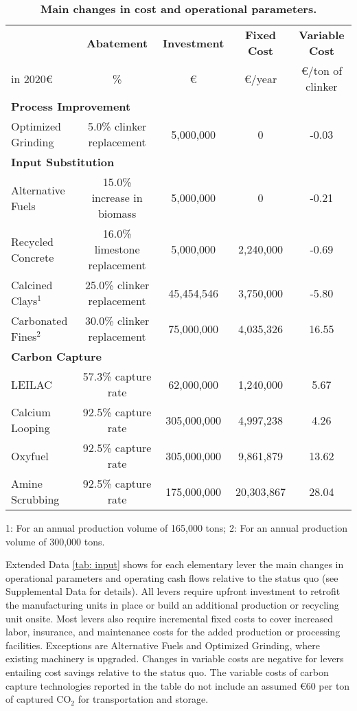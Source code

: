 \documentclass[12pt, a4paper]{article} %
\newcommand{\Suppl}{Supplemental}
\begin{document}
\begin{table}[ht!]
\centering
\begin{threeparttable}
\caption{\textbf{Main changes in cost and operational parameters.}}
\label{tab: input}
\small
\setlength\tabcolsep{3pt} %
\begin{tabular}{l c c c c}
\toprule
& \textbf{Abatement}
& \textbf{Investment}
& \textbf{Fixed Cost}
& \textbf{Variable Cost}
\\
in 2020\euro
& \%
& \euro
& \euro/year
& \euro/ton of clinker
\\
\midrule

\multicolumn{4}{l}{\textbf{Process Improvement}}\\
Optimized Grinding & 5.0\% clinker replacement & 5,000,000 & 0 & -0.03\\
\multicolumn{4}{l}{\textbf{Input Substitution}}\\
Alternative Fuels & 15.0\% increase in biomass & 5,000,000 & 0 & -0.21\\
Recycled Concrete & 16.0\% limestone replacement & 5,000,000 & 2,240,000 & -0.69\\
Calcined Clays$^1$ & 25.0\% clinker replacement & 45,454,546 & 3,750,000 & -5.80\\
Carbonated Fines$^2$ & 30.0\% clinker replacement &  75,000,000 & 4,035,326 & 16.55\\
\multicolumn{4}{l}{\textbf{Carbon Capture}}\\
LEILAC & 57.3\% capture rate & 62,000,000 & 1,240,000 & 5.67\\
Calcium Looping & 92.5\% capture rate & 305,000,000 & 4,997,238 & 4.26\\
Oxyfuel & 92.5\% capture rate & 305,000,000 & 9,861,879 & 13.62\\
Amine Scrubbing & 92.5\% capture rate & 175,000,000 & 20,303,867 & 28.04\\

\bottomrule
\end{tabular}
\begin{tablenotes}
\scriptsize
\item 1: For an annual production volume of 165,000 tons; 2: For an annual production volume of 300,000 tons.
\end{tablenotes}
\end{threeparttable}
\end{table}

Extended Data \autoref{tab: input} shows for each elementary lever the main changes in operational parameters and operating cash flows relative to the status quo (see \Suppl$ $ Data for details). All levers require upfront investment to retrofit the manufacturing units in place or build an additional production or recycling unit onsite. Most levers also require incremental fixed costs to cover increased labor, insurance, and maintenance costs for the added production or processing facilities. Exceptions are Alternative Fuels and Optimized Grinding, where existing machinery is upgraded. Changes in variable costs are negative for levers entailing cost savings relative to the status quo. The variable costs of carbon capture technologies reported in the table do not include an assumed \euro 60 per ton of captured CO$_2$ for transportation and storage.
\end{document}
